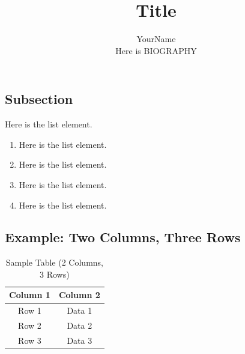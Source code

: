 \documentclass[12pt,journal,compsoc]{IEEEtran}
\begin{document}
\title{Title}
\author{YourName\\
        {\small Here is BIOGRAPHY}}
\date{}

  
\maketitle
\IEEEdisplaynontitleabstractindextext
\IEEEpeerreviewmaketitle




\subsection{Subsection}

Here is the list element. 
\begin{enumerate}
  \item Here is the list element.  
  \item Here is the list element. 
  \item Here is the list element.  
  \item Here is the list element. 
\end{enumerate}

\subsection{Example: Two Columns, Three Rows}
\begin{table}[!t]
  \renewcommand{\arraystretch}{1.2}
  \caption{Sample Table (2 Columns, 3 Rows)}
  \label{table:sample}
  \centering
  \begin{tabular}{|c|c|}
  \hline
  \textbf{Column 1} & \textbf{Column 2}\\
  \hline
  Row 1 & Data 1\\
  \hline
  Row 2 & Data 2\\
  \hline
  Row 3 & Data 3\\
  \hline
  \end{tabular}
\end{table}
\end{document}
